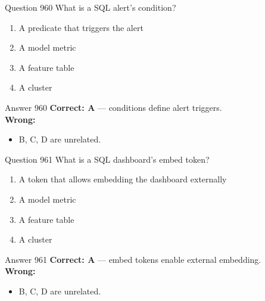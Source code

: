 \documentclass[aspectratio=169,11pt]{beamer}
\begin{document}
	\begin{frame}{Question 960}
		What is a SQL alert's condition?
		\begin{enumerate}[label=\Alph*.]
			\item A predicate that triggers the alert
			\item A model metric
			\item A feature table
			\item A cluster
		\end{enumerate}
	\end{frame}
	\begin{frame}{Answer 960}
		\textbf{Correct: A} --- conditions define alert triggers.\\
		\vspace{0.5em}
		\textbf{Wrong:}
		\begin{itemize}
			\item B, C, D are unrelated.
		\end{itemize}
	\end{frame}
	
	\begin{frame}{Question 961}
		What is a SQL dashboard's embed token?
		\begin{enumerate}[label=\Alph*.]
			\item A token that allows embedding the dashboard externally
			\item A model metric
			\item A feature table
			\item A cluster
		\end{enumerate}
	\end{frame}
	\begin{frame}{Answer 961}
		\textbf{Correct: A} --- embed tokens enable external embedding.\\
		\vspace{0.5em}
		\textbf{Wrong:}
		\begin{itemize}
			\item B, C, D are unrelated.
		\end{itemize}
	\end{frame}
	
\end{document}

